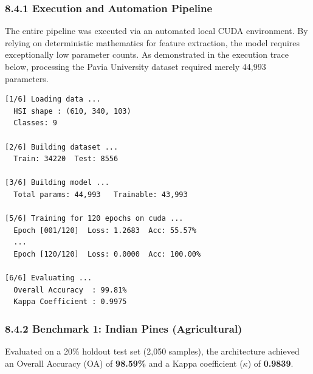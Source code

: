 \documentclass[11pt, letterpaper]{article}
\begin{document}
\subsubsection{8.4.1 Execution and Automation Pipeline}
The entire pipeline was executed via an automated local CUDA environment. By relying on deterministic mathematics for feature extraction, the model requires exceptionally low parameter counts. As demonstrated in the execution trace below, processing the Pavia University dataset required merely 44,993 parameters.

\begin{lstlisting}[style=terminal, caption={Pavia University Pipeline Execution Trace}]
[1/6] Loading data ...
  HSI shape : (610, 340, 103)
  Classes: 9

[2/6] Building dataset ...
  Train: 34220  Test: 8556

[3/6] Building model ...
  Total params: 44,993   Trainable: 43,993

[5/6] Training for 120 epochs on cuda ...
  Epoch [001/120]  Loss: 1.2683  Acc: 55.57%
  ...
  Epoch [120/120]  Loss: 0.0000  Acc: 100.00%

[6/6] Evaluating ...
  Overall Accuracy  : 99.81%
  Kappa Coefficient : 0.9975
\end{lstlisting}

\subsubsection{8.4.2 Benchmark 1: Indian Pines (Agricultural)}
Evaluated on a 20\% holdout test set (2,050 samples), the architecture achieved an Overall Accuracy (OA) of \textbf{98.59\%} and a Kappa coefficient ($\kappa$) of \textbf{0.9839}.
\end{document}
